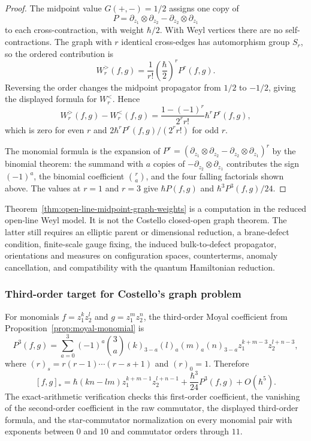 \documentclass[11pt]{memoir}
\begin{document}
\begin{proof}
  The midpoint value $G(+,-)=1/2$ assigns one copy of
  $$P=\partial_{z_1}\otimes\partial_{z_2}
    -\partial_{z_2}\otimes\partial_{z_1}$$
  to each cross-contraction, with weight \(\hbar/2\).  With Weyl vertices
  there are no self-contractions.  The graph with \(r\) identical
  cross-edges has automorphism group \(S_r\), so the ordered contribution
  is
  \[
    W_r^>(f,g)=\frac1{r!}\left(\frac{\hbar}{2}\right)^rP^r(f,g).
  \]
  Reversing the order changes the midpoint propagator from \(1/2\) to
  \(-1/2\), giving the displayed formula for \(W_r^<\).  Hence
  \[
    W_r^>(f,g)-W_r^<(f,g)
      =\frac{1-(-1)^r}{2^r r!}\hbar^rP^r(f,g),
  \]
  which is zero for even \(r\) and \(2\hbar^rP^r(f,g)/(2^r r!)\) for odd
  \(r\).

  The monomial formula is the expansion of
  \(P^r=(\partial_{z_1}\otimes\partial_{z_2}
  -\partial_{z_2}\otimes\partial_{z_1})^r\) by the binomial theorem:
  the summand with \(a\) copies of
  \(-\partial_{z_2}\otimes\partial_{z_1}\) contributes the sign
  \((-1)^a\), the binomial coefficient \(\binom ra\), and the four
  falling factorials shown above.  The values at \(r=1\) and \(r=3\)
  give \(\hbar P(f,g)\) and \(\hbar^3P^3(f,g)/24\).
\end{proof}

\begin{rmk}
  Theorem~\ref{thm:open-line-midpoint-graph-weights} is a computation in
  the reduced open-line Weyl model. It is not the Costello closed-open graph
  theorem. The latter still requires an elliptic parent or dimensional
  reduction, a brane-defect condition, finite-scale gauge fixing, the induced
  bulk-to-defect propagator, orientations and measures on configuration spaces,
  counterterms, anomaly cancellation, and compatibility with the quantum
  Hamiltonian reduction.
\end{rmk}

\subsubsection{Third-order target for Costello's graph problem}
For monomials $f=z_1^kz_2^l$ and $g=z_1^mz_2^n$, the third-order Moyal
coefficient from Proposition~\ref{prop:moyal-monomial} is
$$P^3(f,g)=
  \sum_{a=0}^3(-1)^a\binom{3}{a}
  (k)_{3-a}(l)_a(m)_a(n)_{3-a}
  z_1^{k+m-3}z_2^{l+n-3},$$
where $(r)_s=r(r-1)\cdots(r-s+1)$ and $(r)_0=1$. Therefore
$$[f,g]_*=\hbar(kn-lm)z_1^{k+m-1}z_2^{l+n-1}
  +\frac{\hbar^3}{24}P^3(f,g)+O(\hbar^5).$$
The exact-arithmetic verification checks this first-order coefficient, the
vanishing of the second-order coefficient in the raw commutator, the displayed
third-order formula, and the star-commutator normalization on every monomial
pair with exponents between \(0\) and \(10\) and commutator orders through
\(11\).
\end{document}
